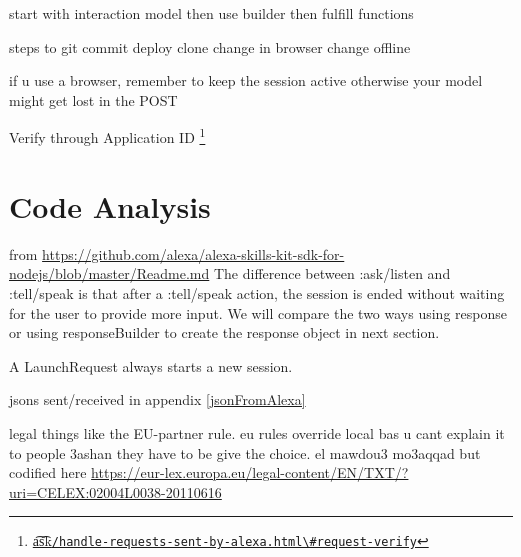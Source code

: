 start with interaction model
then use builder
then fulfill functions


steps to git commit
deploy
clone
change in browser
change offline


if u use a browser, remember to keep the session active otherwise your model might get lost in the POST










Verify through Application ID \footnote{\href{https://developer.amazon.com/docs/custom-skills/handle-requests-sent-by-alexa.html\#request-verify}{\t{a\t{sk}}\lstinline|/handle-requests-sent-by-alexa.html\#request-verify|}}








\section{Code Analysis}

from \url{https://github.com/alexa/alexa-skills-kit-sdk-for-nodejs/blob/master/Readme.md}
The difference between :ask/listen and :tell/speak is that after a :tell/speak action, the session is ended without waiting for the user to provide more input. We will compare the two ways using response or using responseBuilder to create the response object in next section.



A LaunchRequest always starts a new session.




jsons sent/received in appendix
\ref{jsonFromAlexa}






legal things like the EU-partner rule.
eu rules override local
bas u cant explain it to people 3ashan they have to be give the choice.
el mawdou3 mo3aqqad but codified here
\url{https://eur-lex.europa.eu/legal-content/EN/TXT/?uri=CELEX:02004L0038-20110616}












